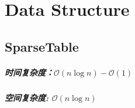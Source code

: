 \chapter{Data Structure}

\section{SparseTable}

\paragraph{时间复杂度：$\mathcal{O} (n\log{n}) - \mathcal{O}(1)$}

\paragraph{空间复杂度: $\mathcal{O} (n\log{n})$}

\inputminted{cpp}{\source/data-structure/sparse-table/sparse-table.cpp}
